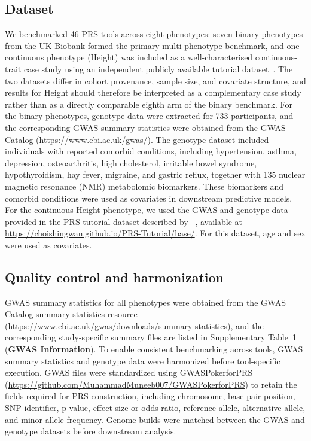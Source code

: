 \documentclass[pdflatex,sn-basic]{sn-jnl}
\begin{document}
\subsection*{Dataset}
We benchmarked 46 PRS tools across eight phenotypes: seven binary phenotypes from the UK Biobank formed the primary multi-phenotype benchmark, and one continuous phenotype (Height) was included as a well-characterised continuous-trait case study using an independent publicly available tutorial dataset~\cite{Choi2020}. The two datasets differ in cohort provenance, sample size, and covariate structure, and results for Height should therefore be interpreted as a complementary case study rather than as a directly comparable eighth arm of the binary benchmark. For the binary phenotypes, genotype data were extracted for 733 participants, and the corresponding GWAS summary statistics were obtained from the GWAS Catalog (\url{https://www.ebi.ac.uk/gwas/}). The genotype dataset included individuals with reported comorbid conditions, including hypertension, asthma, depression, osteoarthritis, high cholesterol, irritable bowel syndrome, hypothyroidism, hay fever, migraine, and gastric reflux, together with 135 nuclear magnetic resonance (NMR) metabolomic biomarkers. These biomarkers and comorbid conditions were used as covariates in downstream predictive models. For the continuous Height phenotype, we used the GWAS and genotype data provided in the PRS tutorial dataset described by ~\cite{Choi2020}, available at \url{https://choishingwan.github.io/PRS-Tutorial/base/}. For this dataset, age and sex were used as covariates.






   

\subsection*{Quality control and harmonization}
GWAS summary statistics for all phenotypes were obtained from the GWAS Catalog summary statistics resource (\url{https://www.ebi.ac.uk/gwas/downloads/summary-statistics}), and the corresponding study-specific summary files are listed in Supplementary Table~1 (\textbf{GWAS Information}). To enable consistent benchmarking across tools, GWAS summary statistics and genotype data were harmonized before tool-specific execution. GWAS files were standardized using GWASPokerforPRS (\url{https://github.com/MuhammadMuneeb007/GWASPokerforPRS}) to retain the fields required for PRS construction, including chromosome, base-pair position, SNP identifier, p-value, effect size or odds ratio, reference allele, alternative allele, and minor allele frequency. Genome builds were matched between the GWAS and genotype datasets before downstream analysis. 
\end{document}
